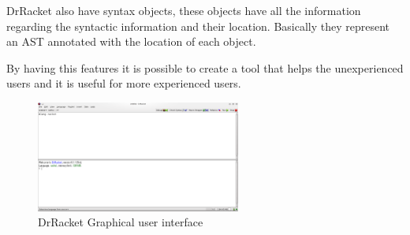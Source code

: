 DrRacket also have syntax objects, these objects have all the information regarding the syntactic information and their location. Basically they represent an AST annotated with the location of each object.

By having this features it is possible to create a tool that helps the unexperienced users and it is useful for more experienced users.









\begin{figure}[htbp]
	\centering
	\includegraphics[width=0.6\textwidth]{img/DrRacketGui.png}
	\caption{DrRacket Graphical user interface}
	\label{fig:DrRacketGui}
\end{figure}